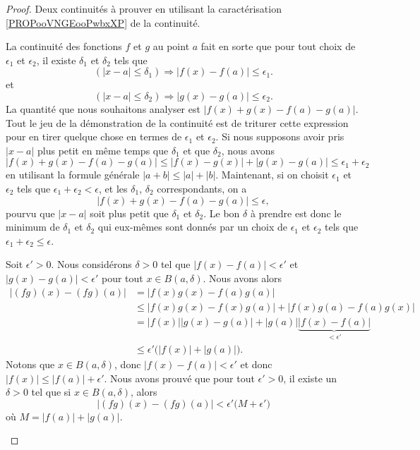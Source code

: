 \begin{proof}
	Deux continuités à prouver en utilisant la caractérisation \ref{PROPooVNGEooPwbxXP} de la continuité.
	\begin{subproof}
		\spitem[La somme]

		La continuité des fonctions \( f\) et \( g\) au point \( a\) fait en sorte que pour tout choix de \( \epsilon_1\) et \( \epsilon_2\), il existe \( \delta_1\) et \( \delta_2\) tels que
		\[
			(| x-a |\leq \delta_1)\Rightarrow | f(x)-f(a) |\leq \epsilon_1.
		\]
		et
		\[
			(| x-a |\leq \delta_2)\Rightarrow | g(x)-g(a) |\leq \epsilon_2.
		\]
		La quantité que nous souhaitons analyser est \( | f(x)+g(x)-f(a)-g(a) |\). Tout le jeu de la démonstration de la continuité est de triturer cette expression pour en tirer quelque chose en termes de \( \epsilon_1\) et \( \epsilon_2\). Si nous supposons avoir pris \( | x-a |\) plus petit en même temps que \( \delta_1\) et que \( \delta_2\), nous avons
		\[
			| f(x)+g(x)-f(a)-g(a) |\leq| f(x)-g(x) |+| g(x)-g(a) |\leq\epsilon_1+\epsilon_2
		\]
		en utilisant la formule générale \( | a+b |\leq | a |+| b |\). Maintenant, si on choisit \( \epsilon_1\) et \( \epsilon_2\) tels que \( \epsilon_1+\epsilon_2<\epsilon\), et les \( \delta_1\), \( \delta_2\) correspondants, on a
		\[
			| f(x)+g(x)-f(a)-g(a) |\leq\epsilon,
		\]
		pourvu que \( | x-a |\) soit plus petit que \( \delta_1\) et \( \delta_2\). Le bon \( \delta\) à prendre est donc le minimum de \( \delta_1\) et \( \delta_2\) qui eux-mêmes sont donnés par un choix de \( \epsilon_1\) et \( \epsilon_2\) tels que \( \epsilon_1+\epsilon_2\leq\epsilon\).

		\spitem[Le produit]
		Soit \( \epsilon'>0\). Nous considérons \( \delta>0\) tel que \( | f(x)-f(a) |<\epsilon'\) et \( | g(x)-g(a) |<\epsilon'\) pour tout \( x\in B(a,\delta)\). Nous avons alors
		\begin{subequations}
			\begin{align}
				| (fg)(x)-(fg)(a) | & =| f(x)g(x)-f(a)g(a) |                                                  \\
				                    & \leq | f(x)g(x)-f(x)g(a) |+| f(x)g(a)-f(a)g(x) |                        \\
				                    & =| f(x) || g(x)-g(a) |+| g(a) |\underbrace{| f(x)-f(a) |}_{< \epsilon'} \\
				                    & \leq \epsilon'\big( | f(x) |+| g(a) | \big).
			\end{align}
		\end{subequations}
		Notons que \( x\in B(a,\delta)\), donc \( |f(x)- f(a) |<\epsilon'\) et donc \( | f(x) |\leq | f(a) |+\epsilon'\). Nous avons prouvé que pour tout \( \epsilon'>0\), il existe un \( \delta>0\) tel que si \( x\in B(a,\delta)\), alors
		\begin{equation}		\label{EQooSMPXooIhJmnJ}
			| (fg)(x)-(fg)(a) |<\epsilon'\big( M+\epsilon' \big)
		\end{equation}
		où \( M=| f(a) |+| g(a) |\).


\end{subproof}
\end{proof}
